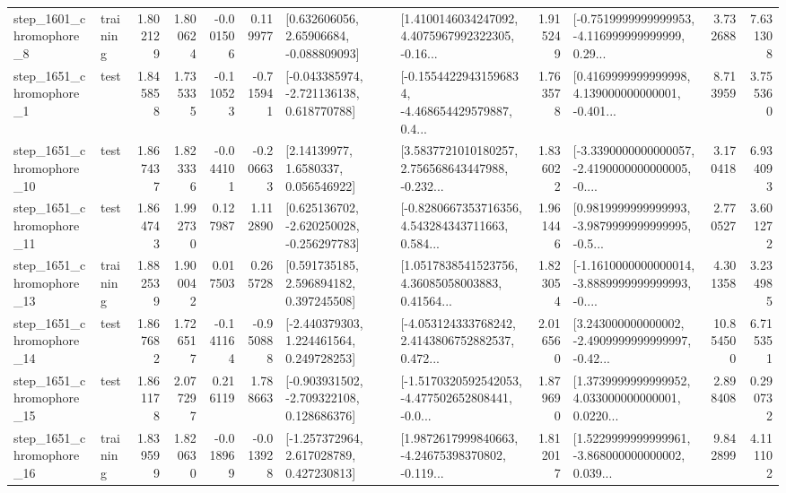 \begin{tabular}{llrrrrllrlrr}
  step\_1601\_chromophore\_8 &  training &      1.802129 &    1.800624 &     -0.001506 &  0.119977 &     [0.632606056, 2.65906684, -0.088809093] &  [1.4100146034247092, 4.4075967992322305, -0.16... &       1.915249 &  [-0.7519999999999953, -4.116999999999999, 0.29... &            3.732688 &          7.631308 \\
  step\_1651\_chromophore\_1 &      test &      1.845858 &    1.735335 &     -0.110523 & -0.715941 &   [-0.043385974, -2.721136138, 0.618770788] &  [-0.15544229431596834, -4.468654429579887, 0.4... &       1.763578 &  [0.4169999999999998, 4.139000000000001, -0.401... &            8.713959 &          3.755360 \\
 step\_1651\_chromophore\_10 &      test &      1.867437 &    1.823336 &     -0.044101 & -0.206633 &        [2.14139977, 1.6580337, 0.056546922] &  [3.5837721010180257, 2.756568643447988, -0.232... &       1.836022 &  [-3.3390000000000057, -2.4190000000000005, -0.... &            3.170418 &          6.934093 \\
 step\_1651\_chromophore\_11 &      test &      1.864743 &    1.992730 &      0.127987 &  1.112890 &   [0.625136702, -2.620250028, -0.256297783] &  [-0.8280667353716356, 4.543284343711663, 0.584... &       1.961446 &  [0.9819999999999993, -3.9879999999999995, -0.5... &            2.770527 &          3.601272 \\
 step\_1651\_chromophore\_13 &  training &      1.882539 &    1.900042 &      0.017503 &  0.265728 &     [0.591735185, 2.596894182, 0.397245508] &  [1.0517838541523756, 4.36085058003883, 0.41564... &       1.823054 &  [-1.1610000000000014, -3.8889999999999993, -0.... &            4.301358 &          3.234985 \\
 step\_1651\_chromophore\_14 &      test &      1.867682 &    1.726517 &     -0.141164 & -0.950888 &    [-2.440379303, 1.224461564, 0.249728253] &  [-4.053124333768242, 2.4143806752882537, 0.472... &       2.016560 &  [3.243000000000002, -2.4909999999999997, -0.42... &           10.854500 &          6.715351 \\
 step\_1651\_chromophore\_15 &      test &      1.861178 &    2.077297 &      0.216119 &  1.788663 &   [-0.903931502, -2.709322108, 0.128686376] &  [-1.5170320592542053, -4.477502652808441, -0.0... &       1.879690 &  [1.3739999999999952, 4.033000000000001, 0.0220... &            2.898408 &          0.290732 \\
 step\_1651\_chromophore\_16 &  training &      1.839599 &    1.820630 &     -0.018969 & -0.013928 &    [-1.257372964, 2.617028789, 0.427230813] &  [1.9872617999840663, -4.24675398370802, -0.119... &       1.812017 &  [1.5229999999999961, -3.868000000000002, 0.039... &            9.842899 &          4.111102 \\

\end{tabular}
